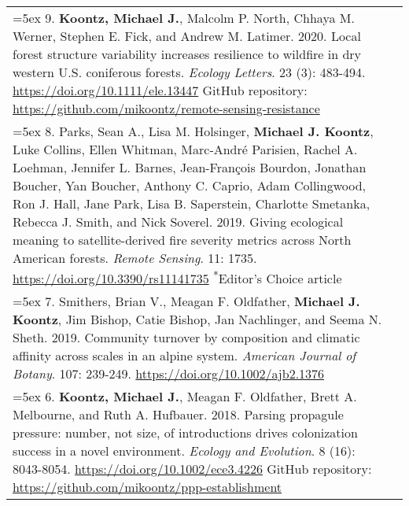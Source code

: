 \begin{longtable}{@{} >{\raggedright}p{6.10in} >{\raggedleft}X @{}}
\hangindent=5ex 9. \textbf{Koontz, Michael J.}, Malcolm P. North, Chhaya M. Werner, Stephen E. Fick, and Andrew M. Latimer. 2020. Local forest structure variability increases resilience to wildfire in dry western U.S. coniferous forests. \emph{Ecology Letters}. 23 (3): 483-494. \href{https://doi.org/10.1111/ele.13447}{https://doi.org/10.1111/ele.13447} 
\newline GitHub repository: \href{https://github.com/mikoontz/remote-sensing-resistance}{https://github.com/mikoontz/remote-sensing-resistance} & \tabularnewline

\hangindent=5ex 8. Parks, Sean A., Lisa M. Holsinger, \textbf{Michael J. Koontz}, Luke Collins, Ellen Whitman, Marc-Andr\'e Parisien, Rachel A. Loehman, Jennifer L. Barnes, Jean-Fran\c{c}ois Bourdon, Jonathan Boucher, Yan Boucher, Anthony C. Caprio, Adam Collingwood, Ron J. Hall, Jane Park, Lisa B. Saperstein, Charlotte Smetanka, Rebecca J. Smith, and Nick Soverel. 2019. Giving ecological meaning to satellite-derived fire severity metrics across North American forests. \emph{Remote Sensing}. 11: 1735. \href{https://doi.org/10.3390/rs11141735}{https://doi.org/10.3390/rs11141735} \newline \textsuperscript{*}Editor's Choice article & \tabularnewline

\hangindent=5ex 7. Smithers, Brian V., Meagan F. Oldfather, \textbf{Michael J. Koontz}, Jim Bishop, Catie Bishop, Jan Nachlinger, and Seema N. Sheth. 2019. Community turnover by composition and climatic affinity across scales in an alpine system. \emph{American Journal of Botany}. 107: 239-249. \href{https://doi.org/10.1002/ajb2.1376}{https://doi.org/10.1002/ajb2.1376} & \tabularnewline

\hangindent=5ex 6. \textbf{Koontz, Michael J.}, Meagan F. Oldfather, Brett A. Melbourne, and Ruth A. Hufbauer. 2018. Parsing propagule pressure: number, not size, of introductions drives colonization success in a novel environment. \emph{Ecology and Evolution}. 8 (16): 8043-8054. \href{https://doi.org/10.1002/ece3.4226}{https://doi.org/10.1002/ece3.4226}
\newline GitHub repository: \href{https://github.com/mikoontz/ppp-establishment}{https://github.com/mikoontz/ppp-establishment} & \tabularnewline


\end{longtable}
